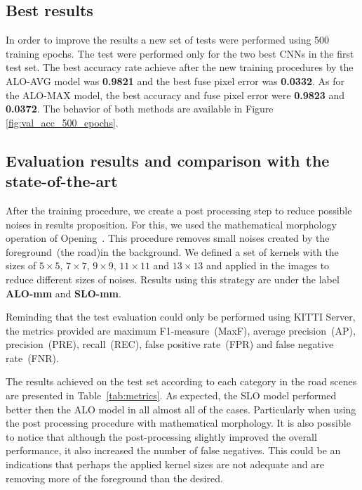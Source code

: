 \subsection{Best results}

In order to improve the results a new set of tests were performed using 500 training epochs. The test were performed only for the two best CNNs in the first test set. The best accuracy rate achieve after the new training procedures by the ALO-AVG model was \textbf{0.9821} and the best fuse pixel error was \textbf{0.0332}. As for the ALO-MAX model, the best accuracy and fuse pixel error were \textbf{0.9823} and \textbf{0.0372}. The behavior of both methods are available in Figure \ref{fig:val_acc_500_epochs}.

{\color{green}{Adicionar informacao sobre os resultados do conjunto de testes}}

\subsection{Evaluation results and comparison with the state-of-the-art}

After the training procedure, we create a post processing step to reduce possible noises in results proposition. For this, we used the mathematical morphology operation of Opening~\cite{najman13}. This procedure removes small noises created by the foreground~(the road)in the background. We defined a set of kernels with the sizes of $5\times5$, $7\times7$, $9\times9$, $11\times11$ and $13\times13$ and applied in the images to reduce different sizes of noises. Results using this strategy are under the label \textbf{ALO-mm} and \textbf{SLO-mm}.

Reminding that the test evaluation could only be performed using KITTI Server, the metrics provided are maximum F1-measure~(MaxF), average precision~(AP), precision~(PRE), recall~(REC), false positive rate~(FPR) and false negative rate~(FNR). 

The results achieved  on the test set according to each category in the road scenes are presented in Table~\ref{tab:metrics}. As expected, the SLO model performed better then the ALO model in all almost all of the cases. Particularly when using the post processing procedure with mathematical morphology. It is also possible to notice that although the post-processing slightly improved the overall performance, it also increased the number of false negatives. This could be an indications that perhaps the applied kernel sizes are not adequate and are removing more of the foreground than the desired.   

